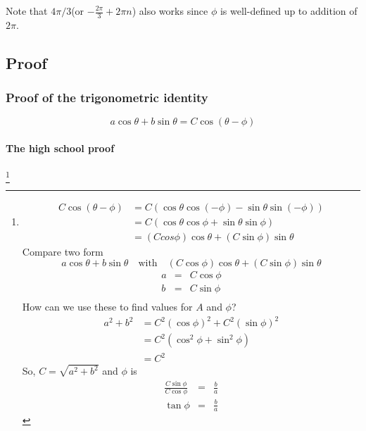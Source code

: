 Note that $4 \pi / 3$(or $-\frac{2\pi }{3}+2\pi n$) also works since $\phi$ is
well-defined up to addition of $2 \pi$. 
\clearpage

\subsection{Proof}
\subsubsection{Proof of the trigonometric identity}
\begin{equation*}
  a \cos \theta + b \sin \theta = C \cos \left( \theta - \phi \right)
\end{equation*}

\paragraph{The high school proof}\footnote{
  \begin{align*}
    C \cos (\theta - \phi) &= C \left(\cos\theta \cos(-\phi) - \sin \theta \sin(-\phi) \right) \\
    &= C \left(\cos\theta \cos \phi + \sin \theta \sin \phi \right) \\
    &= (C cos \phi) \cos \theta + (C \sin \phi) \sin \theta
  \end{align*}
  Compare two form
  \begin{equation*}
    a \cos \theta + b \sin \theta \quad \text{with} \quad
    (C \cos \phi) \cos \theta + (C \sin \phi) \sin \theta
  \end{equation*}
  \begin{eqnarray*}
    a &=& C \cos \phi\\
    b &=& C \sin \phi \\
  \end{eqnarray*}
  How can we use these to find values for $A$ and $\phi$?
  \begin{align*}
    a^2 + b^2 &= C^2 (\cos \phi)^2 + C^2(\sin \phi)^2 \\
              &= C^2(\cos^2 \phi + \sin^2 \phi) \\
              &= C^2
  \end{align*}
  So, $\displaystyle C \displaystyle = \displaystyle \sqrt{a^2 + b^2}$ and
  $\phi$ is
  \begin{eqnarray*}
    \displaystyle \frac{C \sin \phi}{C \cos \phi}
    &\displaystyle = & \displaystyle \frac{b}{a}\\
    \tan \phi &=& \frac{b}{a}                                                                     
  \end{eqnarray*}
}

